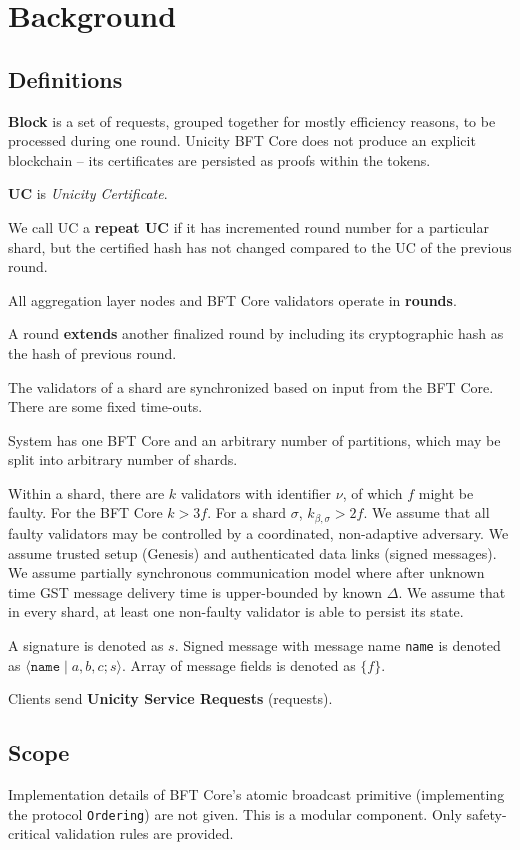 \chapter{Background}

\section{Definitions}\label{definitions}

\textbf{Block} is a set of requests, grouped together for mostly
efficiency reasons, to be processed during one round. Unicity BFT Core does not produce an explicit blockchain -- its certificates are persisted
as proofs within the tokens.

\textbf{UC} is \emph{Unicity Certificate}.

We call UC a \textbf{repeat UC} if it has incremented round number for a particular
shard, but the certified hash has not changed compared to the UC of the previous round.

All aggregation layer nodes and BFT Core validators operate in \textbf{rounds}.

A round \textbf{extends} another finalized round by including its cryptographic
hash as the hash of previous round.

The validators of a shard are synchronized based on input
from the BFT Core. There are some fixed time-outs.

System has one BFT Core and an arbitrary number of
partitions, which may be split into arbitrary number of shards.

Within a shard, there are $k$ validators with identifier $\nu$, of which
$f$ might be faulty. For the BFT Core $k > 3f$. For a shard
$\sigma$, $k_{\beta, \sigma} > 2f$. We assume that all faulty validators may be
controlled by a coordinated, non-adaptive adversary. We assume trusted
setup (Genesis) and authenticated data links (signed messages). We assume
partially synchronous communication model where after unknown time GST
message delivery time is upper-bounded by known $\Delta$. We assume
that in every shard, at least one non-faulty validator is able to persist its
state.

A signature is denoted as $s$. Signed message with message name \texttt{name} is denoted as
$\langle \texttt{name} \mid a, b, c; s \rangle$.
Array of message fields is denoted as $\{f\}$.

Clients send \textbf{Unicity Service Requests} (requests).


\section{Scope}\label{scope}
Implementation details of BFT Core's atomic broadcast primitive (implementing the protocol
\texttt{Ordering}) are not given. This is a modular component. Only safety-critical validation rules are provided.


